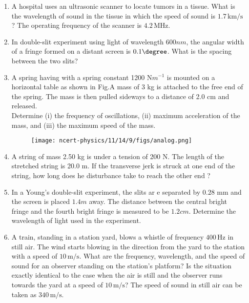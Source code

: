 \begin{enumerate}[label=\thesection.\arabic*,ref=\thesection.\theenumi]
\item
A hospital uses an ultrasonic scanner to locate tumors in a tissue. What is the wavelength of sound in the tissue in which the speed of sound is $1.7 \, \text{km/s}$? The operating frequency of the scanner is $4.2 \, \text{MHz}$.
\solution
\pagebreak

\item In double-slit experiment using light of wavelength $600 nm$, the
angular width of a fringe formed on a distant screen is $0.1\degree$. What is
the spacing between the two slits?\\
\solution
\pagebreak

\item A spring having with a spring constant 1200 N$m^{-1}$ is mounted on a horizontal
table as shown in Fig.A mass of 3 kg is attached to the free end of the
spring. The mass is then pulled sideways to a distance of 2.0 cm and released.\\
Determine (i) the frequency of oscillations, (ii) maximum acceleration of the mass,
and (iii) the maximum speed of the mass.
\begin{figure}[h!]
    \centering
    \texttt{[image: ncert-physics/11/14/9/figs/analog.png]}
    \caption{ }

\end{figure}
\solution
\pagebreak


\item A string of mass 2.50 kg is under a tension of 200 N. The length of the stretched string is 20.0 m. If the transverse jerk is struck at one end of the string, how long does he disturbance take to reach the other end ? 
\solution
\pagebreak

\item In a Young's double-slit experiment, the slits ar e separated by $0.28$ mm and the screen is placed $1.4 m$ away. The distance between the central bright fringe and the fourth bright fringe is measured to be $1.2 cm$. Determine the wavelength of light used in the experiment.\\
\solution
\pagebreak

\item A train, standing in a station yard, blows a whistle of frequency $400 \, \text{Hz}$ in still air. The wind starts blowing in the direction from the yard to the station with a speed of $10 \, \text{m/s}$. What are the frequency, wavelength, and the speed of sound for an observer standing on the station's platform? Is the situation exactly identical to the case when the air is still and the observer runs towards the yard at a speed of $10\, \text{m/s}$? The speed of sound in still air can be taken as $340\, \text{m/s}$.
\solution
\pagebreak

\end{enumerate}

